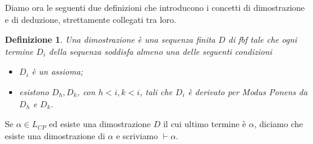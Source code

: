 \documentclass[a4paper, 12pt]{article}
\newtheorem{definition}{Definizione}
\begin{document}

Diamo ora le seguenti due definizioni che introducono i concetti di dimostrazione e di
deduzione, strettamente collegati tra loro.

\begin{definition}
Una dimostrazione è una sequenza finita $D$ di fbf tale che
ogni termine $D_i$ della sequenza soddisfa almeno una delle seguenti condizioni
\begin{itemize}
\item $D_i$ è un assioma;
\item esistono $D_h, D_k$, con $h < i, k < i$, tali che $D_i$ è derivato per \textit{Modus Ponens}
da $D_h$ e $D_k$.
\end{itemize}
\end{definition}

Se $\alpha \in L_{CP}$ ed esiste una dimostrazione $D$ il cui ultimo termine è $\alpha$,
diciamo che esiste una dimostrazione di $\alpha$ e scriviamo $\vdash \alpha$.
\end{document}
